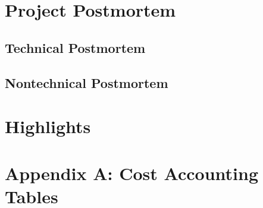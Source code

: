 \documentclass[11pt]{report}
\begin{document}
\begin{spacing}{1.5}
\section*{Project Postmortem}

    \subsection*{Technical Postmortem}
    
    \subsection*{Nontechnical Postmortem}

\section*{Highlights}



{}

\clearpage

\section*{Appendix A: Cost Accounting Tables}


\end{spacing}
\end{document}
